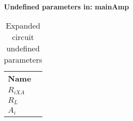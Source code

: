 {\textbf{Undefined parameters in: mainAmp}}

\begin{table}[H]
\centering
\begin{tabular}[c]{l}
\textbf{Name} \\ 
\rowcolor{myyellow}
$R_{i XA}$ \\ 
$R_{L}$ \\ 
\rowcolor{myyellow}
$A_{i}$ \\ 
\end{tabular}
\caption{Expanded circuit undefined parameters}
\end{table}

